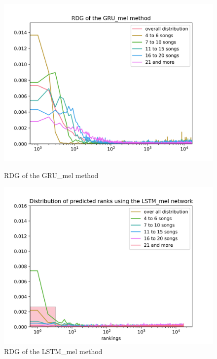 \begin{figure}[h]
\centering
\begin{minipage}{.45\textwidth}
  \centering
  \includegraphics[width=1\linewidth]{./img/gru_mel_graph.png}
  \caption[RDG of the GRU\_mel method]{RDG of the \newline GRU\_mel method}
  \label{fig:gru_mel_distribution}
\end{minipage}
 \vspace{1cm}
\begin{minipage}{.45\textwidth}
  \centering
  \includegraphics[width=1\linewidth]{./img/lstm_mel_graph.png}
  \caption[RDG of the LSTM\_mel method]{RDG of the \newline LSTM\_mel method}
  \label{fig:lstm_mel_distribution}
\end{minipage}
\end{figure}\label{fig:mel_nn_distributions}

